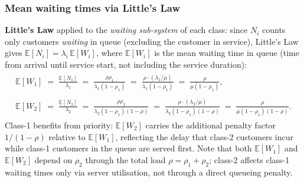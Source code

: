 \subsubsection{Mean waiting times via Little's Law}

\textbf{Little's Law} applied to the \emph{waiting sub-system} of each class: since
$N_i$ counts only customers \emph{waiting} in queue (excluding the customer in service),
Little's Law gives $\mathbb{E}[N_i]=\lambda_i\,\mathbb{E}[W_i]$, where $\mathbb{E}[W_i]$
is the mean waiting time in queue (time from arrival until service start, not including
the service duration):
\begin{align}
    \begin{split}
        \mathbb{E}[W_1]
        \;=\; \frac{\mathbb{E}[N_1]}{\lambda_1}
        \;=\; \frac{\rho\rho_1}{\lambda_1(1-\rho_1)}
        \;=\; \frac{\rho\cdot(\lambda_1/\mu)}{\lambda_1(1-\rho_1)}
        \;=\; \frac{\rho}{\mu(1-\rho_1)},
    \end{split}
    \label{eq:A:EW1} \\[4pt]
    \begin{split}
        \mathbb{E}[W_2]
        \;=\; \frac{\mathbb{E}[N_2]}{\lambda_2}
        \;=\; \frac{\rho\rho_2}{\lambda_2(1-\rho_1)(1-\rho)}
        \;=\; \frac{\rho\cdot(\lambda_2/\mu)}{\lambda_2(1-\rho_1)(1-\rho)}
        \;=\; \frac{\rho}{\mu(1-\rho_1)(1-\rho)}.
    \end{split}
    \label{eq:A:EW2}
\end{align}
Class-1 benefits from priority: $\mathbb{E}[W_2]$ carries the additional penalty
factor $1/(1-\rho)$ relative to $\mathbb{E}[W_1]$, reflecting the delay that class-2
customers incur while class-1 customers in the queue are served first. Note that both
$\mathbb{E}[W_1]$ and $\mathbb{E}[W_2]$ depend on $\rho_2$ through the total load
$\rho=\rho_1+\rho_2$; class-2 affects class-1 waiting times only via server
utilisation, not through a direct queueing penalty.
